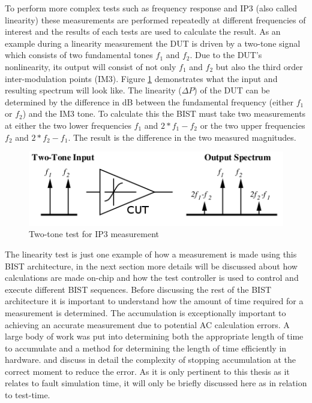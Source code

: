\documentclass[12pt]{report}
\begin{document}
To perform more complex tests such as frequency response and IP3 (also called linearity) these measurements are performed repeatedly at different frequencies of interest and the results of each tests are used to calculate the result.  As an example during a linearity measurement the DUT is driven by a two-tone signal which consists of two fundamental tones $f_1$ and $f_2$.  Due to the DUT's nonlinearity, its output will consist of not only $f_1$ and $f_2$ but also the third order inter-modulation points (IM3)\cite{testtime}.  Figure \ref{fig:linearity-spectrum} demonstrates what the input and resulting spectrum will look like\cite{testtime}.  The linearity ($\Delta P$) of the DUT can be determined by the difference in dB between the fundamental frequency (either $f_1$ or $f_2$) and the IM3 tone\cite{basessa}.  To calculate this the BIST must take two measurements at either the two lower frequencies $f_1$ and $2*f_1-f_2$ or the two upper frequencies $f_2$ and $2*f_2-f_1$\cite{testtime}.  The result is the difference in the two measured magnitudes.
\begin{figure}
	\begin{center}
		\includegraphics[scale=.7]{images/linearity-spectrum}
	\end{center}
	\caption{Two-tone test for IP3 measurement\cite{testtime}}
	\label{fig:linearity-spectrum}
\end{figure}
The linearity test is just one example of how a measurement is made using this BIST architecture, in the next section more details will be discussed about how calculations are made on-chip and how the test controller is used to control and execute different BIST sequences.  Before discussing the rest of the BIST architecture it is important to understand how the amount of time required for a measurement is determined.  The accumulation is exceptionally important to achieving an accurate measurement due to potential AC calculation errors\cite{jie}.  A large body of work was put into determining both the appropriate length of time to accumulate and a method for determining the length of time efficiently in hardware.  \cite{jie} and \cite{testtime} discuss in detail the complexity of stopping accumulation at the correct moment to reduce the error.  As it is only pertinent to this thesis as it relates to fault simulation time, it will only be briefly discussed here as in relation to test-time.
\end{document}
